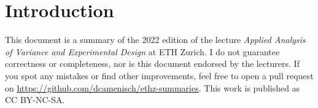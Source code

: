 \section{Introduction}

This document is a summary of the 2022 edition of the lecture \textit{Applied Analysis of Variance and Experimental Design} at ETH Zurich. I do not guarantee correctness or completeness, nor is this document endorsed by the lecturers. If you spot any mistakes or find other improvements, feel free to open a pull request on \url{https://github.com/dcamenisch/ethz-summaries}. This work is published as CC BY-NC-SA.
\begin{center}
	\ccbyncsa
\end{center}
